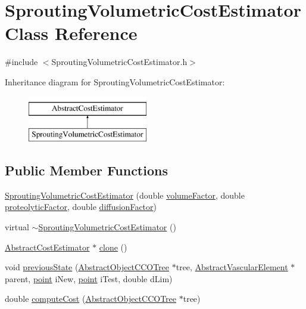 \hypertarget{class_sprouting_volumetric_cost_estimator}{}\section{Sprouting\+Volumetric\+Cost\+Estimator Class Reference}
\label{class_sprouting_volumetric_cost_estimator}


{\ttfamily \#include $<$Sprouting\+Volumetric\+Cost\+Estimator.\+h$>$}

Inheritance diagram for Sprouting\+Volumetric\+Cost\+Estimator\+:\begin{figure}[H]
\begin{center}
\leavevmode
\includegraphics[height=2.000000cm]{d9/d05/class_sprouting_volumetric_cost_estimator}
\end{center}
\end{figure}
\subsection*{Public Member Functions}
\begin{DoxyCompactItemize}
\item 
\hyperlink{class_sprouting_volumetric_cost_estimator_ad6ad29e2e106454a64efa8d96451a1e7}{Sprouting\+Volumetric\+Cost\+Estimator} (double \hyperlink{class_sprouting_volumetric_cost_estimator_ae0a2bc9b3f1b08ff1b69367a638452fe}{volume\+Factor}, double \hyperlink{class_sprouting_volumetric_cost_estimator_a9bedc9f85b7b98700fd977bfbe956a33}{proteolytic\+Factor}, double \hyperlink{class_sprouting_volumetric_cost_estimator_afe49d902defafd1c47bd5c0ac39580cf}{diffusion\+Factor})
\item 
virtual \hyperlink{class_sprouting_volumetric_cost_estimator_a2931866fa094312a56209241970596fb}{$\sim$\+Sprouting\+Volumetric\+Cost\+Estimator} ()
\item 
\hyperlink{class_abstract_cost_estimator}{Abstract\+Cost\+Estimator} $\ast$ \hyperlink{class_sprouting_volumetric_cost_estimator_a9adf0950cceb8f82d66639bdabda6043}{clone} ()
\item 
void \hyperlink{class_sprouting_volumetric_cost_estimator_a712cbceabb8a8f63521af8d31010f955}{previous\+State} (\hyperlink{class_abstract_object_c_c_o_tree}{Abstract\+Object\+C\+C\+O\+Tree} $\ast$tree, \hyperlink{class_abstract_vascular_element}{Abstract\+Vascular\+Element} $\ast$parent, \hyperlink{structpoint}{point} i\+New, \hyperlink{structpoint}{point} i\+Test, double d\+Lim)
\item 
double \hyperlink{class_sprouting_volumetric_cost_estimator_ab301bfd1c1a93aa0f7535f268499dc63}{compute\+Cost} (\hyperlink{class_abstract_object_c_c_o_tree}{Abstract\+Object\+C\+C\+O\+Tree} $\ast$tree)
\end{DoxyCompactItemize}
